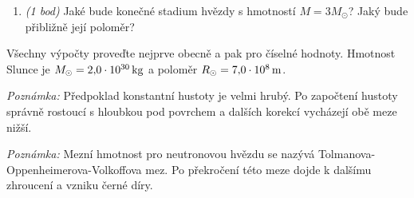 \documentclass[a4paper,11pt,twoside]{article}
\newenvironment{homework}{}{}
\begin{document}
\begin{homework}
\begin{enumerate}
			\item \emph{(1 bod)}
				Jaké bude konečné stadium hvězdy s hmotností $M=3M_{\odot}$? Jaký bude přibližně její poloměr?

		\end{enumerate}

		Všechny výpočty proveďte nejprve obecně a pak pro číselné hodnoty. 
		Hmotnost Slunce je $M_{\odot}=2,\!0\cdot10^{30}\,\mathrm{{kg}}$ a poloměr $R_{\odot}=7,\!0\cdot10^{8}\,\mathrm{{m}}$.

		{\it Poznámka:} Předpoklad konstantní hustoty je velmi hrubý. 
		Po započtení hustoty správně rostoucí s hloubkou pod povrchem a dalších korekcí vycházejí obě meze nižší.

		{\it Poznámka:} Mezní hmotnost pro neutronovou hvězdu se nazývá Tolmanova-Oppenheimerova-Volkoffova mez.
		Po překročení této meze dojde k dalšímu zhroucení a vzniku černé díry.

		\newpage
\end{homework}
\end{document}
